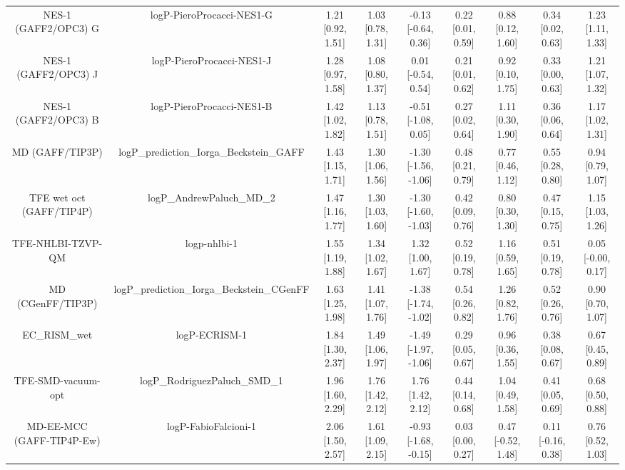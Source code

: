 \documentclass{article}
\begin{document}
\begin{center}
\begin{longtable}{|ccccccccc|}
         NES-1 (GAFF2/OPC3) G &                      logP-PieroProcacci-NES1-G &  1.21 [0.92, 1.51] &  1.03 [0.78, 1.31] &   -0.13 [-0.64, 0.36] &  0.22 [0.01, 0.59] &     0.88 [0.12, 1.60] &     0.34 [0.02, 0.63] &     1.23 [1.11, 1.33] \\
         NES-1 (GAFF2/OPC3) J &                      logP-PieroProcacci-NES1-J &  1.28 [0.97, 1.58] &  1.08 [0.80, 1.37] &    0.01 [-0.54, 0.54] &  0.21 [0.01, 0.62] &     0.92 [0.10, 1.75] &     0.33 [0.00, 0.63] &     1.21 [1.07, 1.32] \\
         NES-1 (GAFF2/OPC3) B &                      logP-PieroProcacci-NES1-B &  1.42 [1.02, 1.82] &  1.13 [0.78, 1.51] &   -0.51 [-1.08, 0.05] &  0.27 [0.02, 0.64] &     1.11 [0.30, 1.90] &     0.36 [0.06, 0.64] &     1.17 [1.02, 1.31] \\
              MD (GAFF/TIP3P) &       logP\_prediction\_Iorga\_Beckstein\_GAFF &  1.43 [1.15, 1.71] &  1.30 [1.06, 1.56] &  -1.30 [-1.56, -1.06] &  0.48 [0.21, 0.79] &     0.77 [0.46, 1.12] &     0.55 [0.28, 0.80] &     0.94 [0.79, 1.07] \\
     TFE wet oct (GAFF/TIP4P) &                      logP\_AndrewPaluch\_MD\_2 &  1.47 [1.16, 1.77] &  1.30 [1.03, 1.60] &  -1.30 [-1.60, -1.03] &  0.42 [0.09, 0.76] &     0.80 [0.30, 1.30] &     0.47 [0.15, 0.75] &     1.15 [1.03, 1.26] \\
            TFE-NHLBI-TZVP-QM &                                   logp-nhlbi-1 &  1.55 [1.19, 1.88] &  1.34 [1.02, 1.67] &     1.32 [1.00, 1.67] &  0.52 [0.19, 0.78] &     1.16 [0.59, 1.65] &     0.51 [0.19, 0.78] &    0.05 [-0.00, 0.17] \\
            MD (CGenFF/TIP3P) &     logP\_prediction\_Iorga\_Beckstein\_CGenFF &  1.63 [1.25, 1.98] &  1.41 [1.07, 1.76] &  -1.38 [-1.74, -1.02] &  0.54 [0.26, 0.82] &     1.26 [0.82, 1.76] &     0.52 [0.26, 0.76] &     0.90 [0.70, 1.07] \\
                  EC_RISM_wet &                                  logP-ECRISM-1 &  1.84 [1.30, 2.37] &  1.49 [1.06, 1.97] &  -1.49 [-1.97, -1.06] &  0.29 [0.05, 0.67] &     0.96 [0.36, 1.55] &     0.38 [0.08, 0.67] &     0.67 [0.45, 0.89] \\
           TFE-SMD-vacuum-opt &                  logP\_RodriguezPaluch\_SMD\_1 &  1.96 [1.60, 2.29] &  1.76 [1.42, 2.12] &     1.76 [1.42, 2.12] &  0.44 [0.14, 0.68] &     1.04 [0.49, 1.58] &     0.41 [0.05, 0.69] &     0.68 [0.50, 0.88] \\
    MD-EE-MCC (GAFF-TIP4P-Ew) &                           logP-FabioFalcioni-1 &  2.06 [1.50, 2.57] &  1.61 [1.09, 2.15] &  -0.93 [-1.68, -0.15] &  0.03 [0.00, 0.27] &    0.47 [-0.52, 1.48] &    0.11 [-0.16, 0.38] &     0.76 [0.52, 1.03] \\

\end{longtable}
\end{center}
\end{document}
